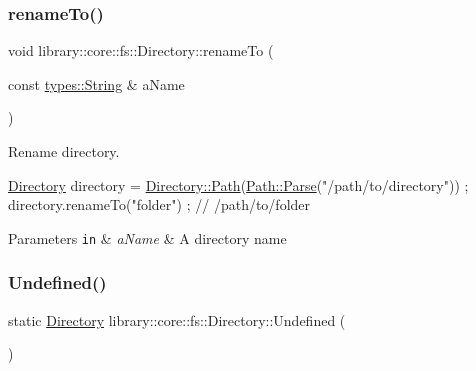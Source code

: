 \subsubsection{\texorpdfstring{rename\+To()}{renameTo()}}
{\footnotesize\ttfamily void library\+::core\+::fs\+::\+Directory\+::rename\+To (\begin{DoxyParamCaption}\item[{const \hyperlink{classlibrary_1_1core_1_1types_1_1String}{types\+::\+String} \&}]{a\+Name }\end{DoxyParamCaption})}



Rename directory. 


\begin{DoxyCode}
\hyperlink{classlibrary_1_1core_1_1fs_1_1Directory_a3ec39f6cad19a81d520e9a1f2d8bb1f7}{Directory} directory = \hyperlink{classlibrary_1_1core_1_1fs_1_1Directory_a6d3ea04654841e62a4dbd99feb563caf}{Directory::Path}(\hyperlink{classlibrary_1_1core_1_1fs_1_1Path_aebf5bd3af83e0b7376616e146f3e55df}{Path::Parse}(\textcolor{stringliteral}{"/path/to/directory"}))
       ;
directory.renameTo(\textcolor{stringliteral}{"folder"}) ; \textcolor{comment}{// /path/to/folder}
\end{DoxyCode}



\begin{DoxyParams}[1]{Parameters}
\mbox{\tt in}  & {\em a\+Name} & A directory name \\
\hline
\end{DoxyParams}
\mbox{\label{classlibrary_1_1core_1_1fs_1_1Directory_ae26fce16c37e5fed2bcc4d914a5eaa71}} 
\subsubsection{\texorpdfstring{Undefined()}{Undefined()}}
{\footnotesize\ttfamily static \hyperlink{classlibrary_1_1core_1_1fs_1_1Directory}{Directory} library\+::core\+::fs\+::\+Directory\+::\+Undefined (\begin{DoxyParamCaption}{ }\end{DoxyParamCaption})\hspace{0.3cm}{\ttfamily [static]}}



